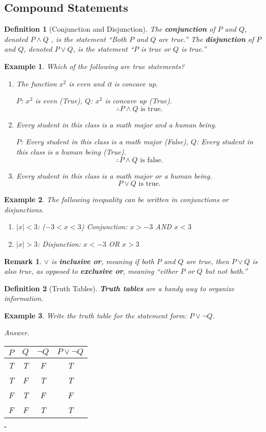 \documentclass[12pt,a4paper]{article}
\newtheorem{df}{Definition}[subsection]
\newtheorem{eg}{Example}[subsection]
\newenvironment*{ans}{\par{\textit{Answer. }}}{\hfill{$\square$}\par}
\newtheorem*{rmk}{\indent Remark}
\begin{document}
\subsection{Compound Statements}
\begin{df}[Conjunction and Disjunction]
	The \textbf{conjunction} of $P$ and $Q$, denoted $P\wedge Q$	, is the statement ``Both $P$ and $Q$ are true.'' The \textbf{disjunction} of $P$ and $Q$, denoted $P\vee Q$, is the statement ``$P$ is true or $Q$ is true.''
\end{df}
\begin{eg}
	Which of the following are true statements?
	\begin{enumerate}
	\item The function $x^2$ is even and it is concave up.
		
		$P$: $x^2$ is even (True), $Q$: $x^2$ is concave up (True).
		\[\therefore P\wedge Q\text{ is true.}\]
	\item Every student in this class is a math major and a human being.
		
		$P$: Every student in this class is a math major (False), $Q$: Every student in this class is a human being (True).
		\[\therefore P\wedge Q\text{ is false.}\]
	\item Every student in this class is a math major or a human being.
		\[P\vee Q\text{ is true.}\]
	\end{enumerate}
\end{eg}
\begin{eg}
	The following inequality can be written in conjunctions or disjunctions.
	\begin{enumerate}
		\item $|x|<3$: ($-3<x<3$) Conjunction: $x>-3$ AND $x<3$
		\item $|x|>3$: Disjunction: $x<-3$ OR $x>3$	
	\end{enumerate}
\end{eg}
\begin{rmk}
	$\vee$ is \textbf{inclusive or}, meaning if both $P$ and $Q$ are true, then $P\vee Q$ is also true, as opposed to \textbf{exclusive or}, meaning ``either $P$ or $Q$ but not both.''	
\end{rmk}
\begin{df}[Truth Tables]
	\textbf{Truth tables} are a handy way to organize information. 
\end{df}
\begin{eg}
	Write the truth table for the statement form: $P\vee\neg Q$.
	\begin{ans}\begin{center}\begin{tabular}{c|c|c|c}
		$P$&$Q$&$\neg Q$&$P\vee\neg Q$\\
		\hline
		T&T&F&T\\
		T&F&T&T\\
		F&T&F&F\\
		F&F&T&T
	\end{tabular}\end{center}\end{ans}
\end{eg}
\end{document}
